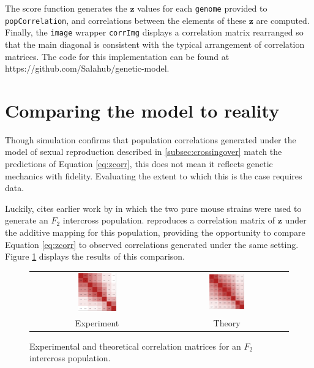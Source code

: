\documentclass{article}
\newcommand{\code}[1]{\texttt{#1}}
\newcommand{\ve}[1]{\mathbf{#1}}           %
\begin{document}
The score function generates the $\ve{z}$ values for each \code{genome} provided to \code{popCorrelation}, and correlations between the elements of these $\ve{z}$ are computed. Finally, the \code{image} wrapper \code{corrImg} displays a correlation matrix rearranged so that the main diagonal is consistent with the typical arrangement of correlation matrices. The code for this implementation can be found at https://github.com/Salahub/genetic-model.

\section{Comparing the model to reality} \label{sec:model2real}

Though simulation confirms that population correlations generated under the model of sexual reproduction described in \ref{subsec:crossingover} match the predictions of Equation \ref{eq:zcorr}, this does not mean it reflects genetic mechanics with fidelity. Evaluating the extent to which this is the case requires data.

Luckily, \cite{cheverud2001} cites earlier work by \cite{cheverudetal2001} in which the two pure mouse strains were used to generate an $F_2$ intercross population. \cite{cheverud2001} reproduces a correlation matrix of $\ve{z}$ under the additive mapping for this population, providing the opportunity to compare Equation \ref{eq:zcorr} to observed correlations generated under the same setting. Figure \ref{fig:corr2real} displays the results of this comparison.

\begin{figure}[htp]
  \begin{center}
    \begin{tabular}{cc}
      \includegraphics[width = 0.300\textwidth]{./img/chevCorr.png} &
      \includegraphics[width = 0.300\textwidth]{./img/chevCorrTheory.png} \\
      {\footnotesize Experiment} &
      {\footnotesize Theory}
    \end{tabular}
  \end{center}
  \caption{Experimental and theoretical correlation matrices for an $F_2$ intercross population.}
  \label{fig:corr2real}
\end{figure}
\end{document}
